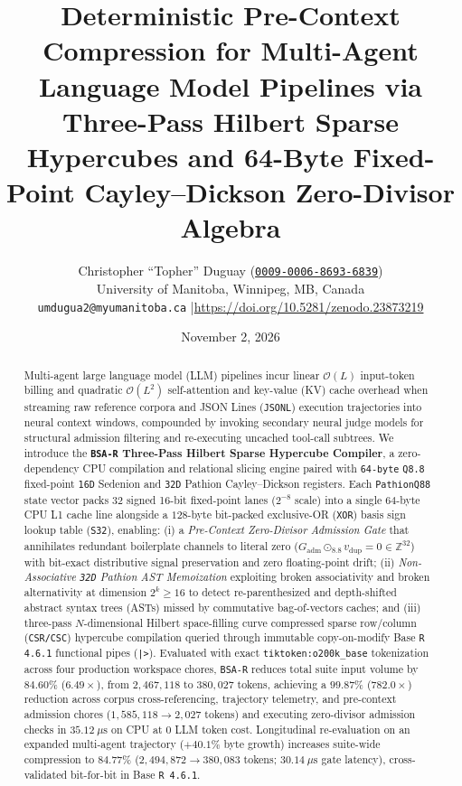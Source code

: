 \documentclass[11pt]{article}
\title{\textbf{Deterministic Pre-Context Compression for Multi-Agent Language Model Pipelines via Three-Pass Hilbert Sparse Hypercubes and 64-Byte Fixed-Point Cayley--Dickson Zero-Divisor Algebra}}
\author{
  Christopher ``Topher'' Duguay (\href{https://orcid.org/0009-0006-8693-6839}{\texttt{0009-0006-8693-6839}})\\
  \small University of Manitoba, Winnipeg, MB, Canada\\
  \small \texttt{umdugua2@myumanitoba.ca} \quad|\quad \url{https://doi.org/10.5281/zenodo.23873219}
}
\date{November 2, 2026}
\theoremstyle{plain}
\theoremstyle{definition}
\begin{document}
\maketitle

\begin{abstract}
Multi-agent large language model (LLM) pipelines incur linear $\mathcal{O}(L)$ input-token billing and quadratic $\mathcal{O}(L^2)$ self-attention and key-value (KV) cache overhead when streaming raw reference corpora and JSON Lines (\texttt{JSONL}) execution trajectories into neural context windows, compounded by invoking secondary neural judge models for structural admission filtering and re-executing uncached tool-call subtrees. We introduce the \textbf{\texttt{BSA-R} Three-Pass Hilbert Sparse Hypercube Compiler}, a zero-dependency CPU compilation and relational slicing engine paired with \texttt{64-byte} \texttt{Q8.8} fixed-point \texttt{16D} Sedenion and \texttt{32D} Pathion Cayley--Dickson registers. Each \texttt{PathionQ88} state vector packs $32$ signed 16-bit fixed-point lanes ($2^{-8}$ scale) into a single $64$-byte CPU L1 cache line alongside a $128$-byte bit-packed exclusive-OR (\texttt{XOR}) basis sign lookup table (\texttt{S32}), enabling: (i) a \emph{Pre-Context Zero-Divisor Admission Gate} that annihilates redundant boilerplate channels to literal zero ($G_{\mathrm{adm}} \odot_{8.8} v_{\mathrm{dup}} = 0 \in \mathbb{Z}^{32}$) with bit-exact distributive signal preservation and zero floating-point drift; (ii) \emph{Non-Associative \texttt{32D} Pathion AST Memoization} exploiting broken associativity and broken alternativity at dimension $2^k \ge 16$ to detect re-parenthesized and depth-shifted abstract syntax trees (ASTs) missed by commutative bag-of-vectors caches; and (iii) three-pass $N$-dimensional Hilbert space-filling curve compressed sparse row/column (\texttt{CSR/CSC}) hypercube compilation queried through immutable copy-on-modify Base \texttt{R 4.6.1} functional pipes (\texttt{|>}). Evaluated with exact \texttt{tiktoken:o200k\_base} tokenization across four production workspace chores, \texttt{BSA-R} reduces total suite input volume by $84.60\%$ ($6.49\times$), from $2{,}467{,}118$ to $380{,}027$ tokens, achieving a $99.87\%$ ($782.0\times$) reduction across corpus cross-referencing, trajectory telemetry, and pre-context admission chores ($1{,}585{,}118 \to 2{,}027$ tokens) and executing zero-divisor admission checks in $35.12~\mu\mathrm{s}$ on CPU at $0$ LLM token cost. Longitudinal re-evaluation on an expanded multi-agent trajectory ($+40.1\%$ byte growth) increases suite-wide compression to $84.77\%$ ($2{,}494{,}872 \to 380{,}083$ tokens; $30.14~\mu\mathrm{s}$ gate latency), cross-validated bit-for-bit in Base \texttt{R 4.6.1}.
\end{abstract}
\end{document}
